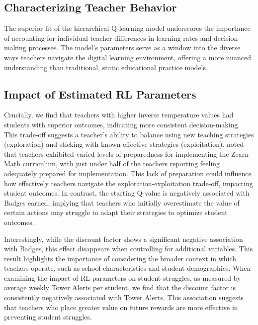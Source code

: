 \documentclass[
  number,
  preprint,
  3p,
  onecolumn]{elsarticle}
\begin{document}
\subsection{Characterizing Teacher
Behavior}\label{characterizing-teacher-behavior}

The superior fit of the hierarchical Q-learning model underscores the
importance of accounting for individual teacher differences in learning
rates and decision-making processes. The model's parameters serve as a
window into the diverse ways teachers navigate the digital learning
environment, offering a more nuanced understanding than traditional,
static educational practice models.

\subsection{Impact of Estimated RL
Parameters}\label{impact-of-estimated-rl-parameters}

Crucially, we find that teachers with higher inverse temperature values
had students with superior outcomes, indicating more consistent
decision-making. This trade-off suggests a teacher's ability to balance
using new teaching strategies (exploration) and sticking with known
effective strategies (exploitation). \citep{morrison2019} noted that
teachers exhibited varied levels of preparedness for implementing the
Zearn Math curriculum, with just under half of the teachers reporting
feeling adequately prepared for implementation. This lack of preparation
could influence how effectively teachers navigate the
exploration-exploitation trade-off, impacting student outcomes. In
contrast, the starting Q-value is negatively associated with Badges
earned, implying that teachers who initially overestimate the value of
certain actions may struggle to adapt their strategies to optimize
student outcomes.

Interestingly, while the discount factor shows a significant negative
association with Badges, this effect disappears when controlling for
additional variables. This result highlights the importance of
considering the broader context in which teachers operate, such as
school characteristics and student demographics. When examining the
impact of RL parameters on student struggles, as measured by average
weekly Tower Alerts per student, we find that the discount factor is
consistently negatively associated with Tower Alerts. This association
suggests that teachers who place greater value on future rewards are
more effective in preventing student struggles.
\end{document}
